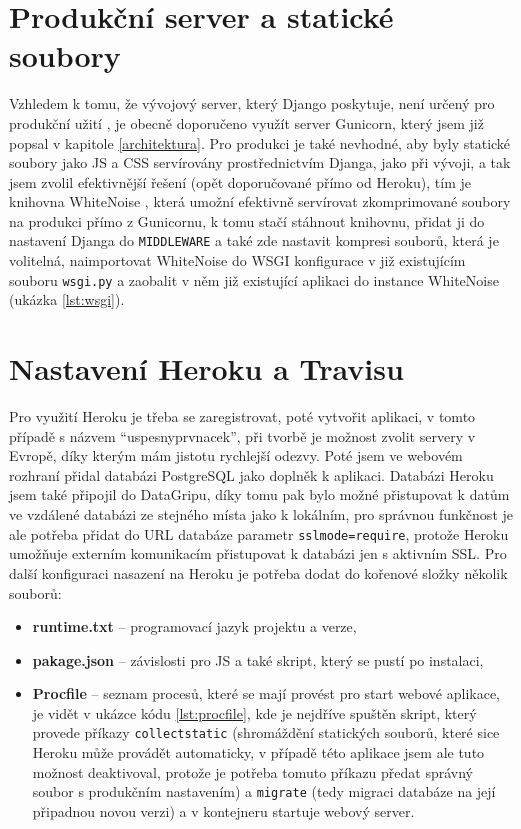     \section{Produkční server a statické soubory}
    Vzhledem k tomu, že vývojový server, který Django poskytuje, není určený pro produkční užití \cite{django-managepy}, je obecně doporučeno využít server Gunicorn, který jsem již popsal v kapitole \ref{architektura}. Pro produkci je také nevhodné, aby byly statické soubory jako JS a CSS servírovány prostřednictvím Djanga, jako při vývoji, a tak jsem zvolil efektivnější řešení (opět doporučované přímo od Heroku), tím je knihovna WhiteNoise \cite{whitenoise}, která umožní efektivně servírovat zkomprimované soubory na produkci přímo z Gunicornu, k tomu stačí stáhnout knihovnu, přidat ji do nastavení Djanga do \verb|MIDDLEWARE| a také zde nastavit kompresi souborů, která je volitelná, naimportovat WhiteNoise do WSGI konfigurace v již existujícím souboru \verb|wsgi.py| a zaobalit v něm již existující aplikaci do instance WhiteNoise (ukázka \ref{lst:wsgi}).
    
    \section{Nastavení Heroku a Travisu}
    Pro využití Heroku je třeba se zaregistrovat, poté vytvořit aplikaci, v tomto případě s názvem \enquote{uspesnyprvnacek}, při tvorbě je možnost zvolit servery v Evropě, díky kterým mám jistotu rychlejší odezvy. Poté jsem ve webovém rozhraní přidal databázi PostgreSQL jako doplněk k aplikaci. Databázi Heroku jsem také připojil do DataGripu, díky tomu pak bylo možné přistupovat k datům ve vzdálené databázi ze stejného místa jako k lokálním, pro správnou funkčnost je ale potřeba přidat do URL databáze parametr \verb|sslmode=require|, protože Heroku umožňuje externím komunikacím přistupovat k databázi jen s aktivním SSL. Pro další konfiguraci nasazení na Heroku je potřeba dodat do kořenové složky několik souborů:
    \begin{itemize}
        \item \textbf{runtime.txt} -- programovací jazyk projektu a verze,
        \item \textbf{pakage.json} -- závislosti pro JS a také skript, který se pustí po instalaci,
        \item \textbf{Procfile} -- seznam procesů, které se mají provést pro start webové aplikace, je vidět v ukázce kódu \ref{lst:procfile}, kde je nejdříve spuštěn skript, který provede příkazy \verb|collectstatic| (shromáždění statických souborů, které sice Heroku může provádět automaticky, v případě této aplikace jsem ale tuto možnost deaktivoval, protože je potřeba tomuto příkazu předat správný soubor s produkčním nastavením) a \verb|migrate| (tedy migraci databáze na její připadnou novou verzi) a v kontejneru startuje webový server.
    \end{itemize}
    
